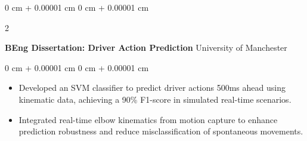 \documentclass[10pt, letterpaper]{article}
\newenvironment{highlights}{
    \begin{itemize}[
        topsep=0.10 cm,
        parsep=0.10 cm,
        partopsep=0pt,
        itemsep=0pt,
        leftmargin=0 cm + 10pt
    ]
}{
    \end{itemize}
} %
\newenvironment{onecolentry}{
    \begin{adjustwidth}{
        0 cm + 0.00001 cm
    }{
        0 cm + 0.00001 cm
    }
}{
    \end{adjustwidth}
} %
\newenvironment{twocolentry}[2][]{
    \onecolentry
    \def\secondColumn{#2}
    \setcolumnwidth{\fill, 4.5 cm}
    \begin{paracol}{2}
}{
    \switchcolumn \raggedleft \secondColumn
    \end{paracol}
    \endonecolentry
} %
\begin{document}
        \vspace{0.2 cm}




        \vspace{0.2 cm}

        \begin{twocolentry}{
            University of Manchester
        }
            \textbf{BEng Dissertation: Driver Action Prediction}\end{twocolentry}

        \vspace{0.10 cm}
        \begin{onecolentry}
            \begin{highlights}
                \item Developed an SVM classifier to predict driver actions 500ms ahead using kinematic data, achieving a 90\% F1-score in simulated real-time scenarios.
                \item Integrated real-time elbow kinematics from motion capture to enhance prediction robustness and reduce misclassification of spontaneous movements.
            \end{highlights}
        \end{onecolentry}



    


    
\end{document}
